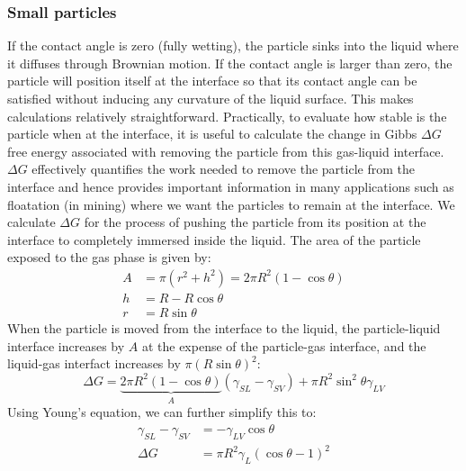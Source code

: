 \documentclass[a4paper, 11pt, normalem]{report}
\begin{document}
\subsection{Small particles}
If the contact angle is zero (fully wetting), the particle sinks into the liquid where it diffuses through Brownian motion.
If the contact angle is larger than zero, the particle will position itself at the interface so that its contact angle can be satisfied without inducing any curvature of the liquid surface.
This makes calculations relatively straightforward.
Practically, to evaluate how stable is the particle when at the interface, it is useful to calculate the change in Gibbs $\Delta G$ free energy associated with removing the particle from this gas-liquid interface.
$\Delta G$ effectively quantifies the work needed to remove the particle  from  the  interface  and  hence  provides  important  information  in  many applications such as floatation (in mining) where we want the particles to remain at the interface.
We  calculate $\Delta G$ for the process of pushing the particle from its position at the interface to completely immersed inside the liquid. The area of the particle exposed to the gas phase is given by:
\begin{align}
    A &= \pi(r^2+h^2) = 2\pi R^2(1-\cos\theta) \\
    h &= R - R\cos\theta \\
    r &= R\sin\theta
\end{align}
When the particle is moved from the interface to the liquid, the particle-liquid interface increases by $A$ at the expense of the particle-gas interface, and the liquid-gas interfact increases by $\pi(R\sin\theta)^2$:
\begin{equation}
    \Delta G = \underbrace{2\pi R^2(1-\cos\theta)}_{A} (\gamma_{SL} - \gamma_{SV}) + \pi R^2\sin^2\theta \gamma_{LV}
\end{equation}
Using Young's equation, we can further simplify this to:
\begin{align}
    \gamma_{SL} - \gamma_{SV} &= -\gamma_{LV}\cos\theta \\
    \Delta G &= \pi R^2\gamma_L(\cos\theta - 1)^2
\end{align}

\chapter{}
\end{document}
